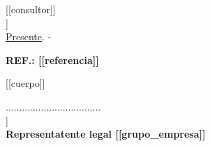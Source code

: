 \documentclass[letterpaper,12pt]{letter}
\begin{document}
\date{\today}
\begin{letter}{ [[consultor]] \\ [[cargo]] \\ \underline {Presente}. -}

\begin{center}
	\opening{\textbf{REF.: [[referencia]] }}
\end{center}

[[cuerpo]]

\vspace{2cm}

\begin{center}
...................................\\
[[representante_legal]]\\
{\bfseries Representatente legal [[grupo_empresa]]}
\end{center}

\end{letter}
\end{document}
